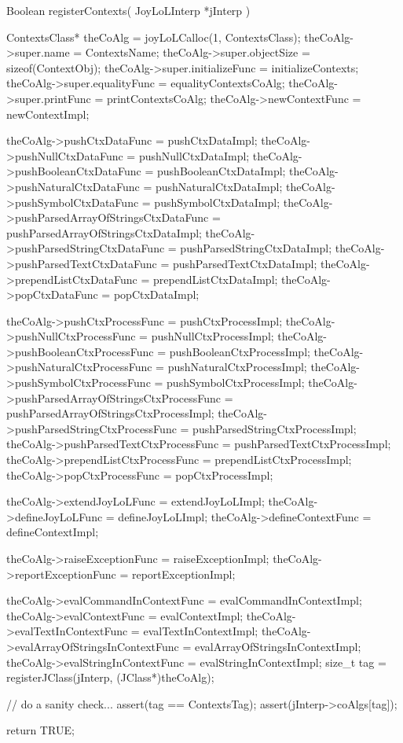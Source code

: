\startCCode
Boolean registerContexts(
  JoyLoLInterp *jInterp
) {
  ContextsClass* theCoAlg    = 
    joyLoLCalloc(1, ContextsClass);
  theCoAlg->super.name             = ContextsName;
  theCoAlg->super.objectSize       = sizeof(ContextObj);
  theCoAlg->super.initializeFunc   = initializeContexts;
  theCoAlg->super.equalityFunc     = equalityContextsCoAlg;
  theCoAlg->super.printFunc        = printContextsCoAlg;
  theCoAlg->newContextFunc         = newContextImpl;
  
  theCoAlg->pushCtxDataFunc        = pushCtxDataImpl;
  theCoAlg->pushNullCtxDataFunc    = pushNullCtxDataImpl;
  theCoAlg->pushBooleanCtxDataFunc = pushBooleanCtxDataImpl;
  theCoAlg->pushNaturalCtxDataFunc = pushNaturalCtxDataImpl;
  theCoAlg->pushSymbolCtxDataFunc  = pushSymbolCtxDataImpl;
  theCoAlg->pushParsedArrayOfStringsCtxDataFunc =
    pushParsedArrayOfStringsCtxDataImpl;
  theCoAlg->pushParsedStringCtxDataFunc =
    pushParsedStringCtxDataImpl;
  theCoAlg->pushParsedTextCtxDataFunc =
    pushParsedTextCtxDataImpl;
  theCoAlg->prependListCtxDataFunc = prependListCtxDataImpl;
  theCoAlg->popCtxDataFunc         = popCtxDataImpl;
  
  theCoAlg->pushCtxProcessFunc     = pushCtxProcessImpl;
  theCoAlg->pushNullCtxProcessFunc = pushNullCtxProcessImpl;
  theCoAlg->pushBooleanCtxProcessFunc =
    pushBooleanCtxProcessImpl;
  theCoAlg->pushNaturalCtxProcessFunc =
    pushNaturalCtxProcessImpl;
  theCoAlg->pushSymbolCtxProcessFunc =
    pushSymbolCtxProcessImpl;
  theCoAlg->pushParsedArrayOfStringsCtxProcessFunc =
    pushParsedArrayOfStringsCtxProcessImpl;
  theCoAlg->pushParsedStringCtxProcessFunc =
    pushParsedStringCtxProcessImpl;
  theCoAlg->pushParsedTextCtxProcessFunc =
    pushParsedTextCtxProcessImpl;
  theCoAlg->prependListCtxProcessFunc =
    prependListCtxProcessImpl;
  theCoAlg->popCtxProcessFunc      = popCtxProcessImpl;
  
  theCoAlg->extendJoyLoLFunc       = extendJoyLoLImpl;
  theCoAlg->defineJoyLoLFunc       = defineJoyLoLImpl;
  theCoAlg->defineContextFunc      = defineContextImpl;

  theCoAlg->raiseExceptionFunc     = raiseExceptionImpl;
  theCoAlg->reportExceptionFunc    = reportExceptionImpl;
  
  theCoAlg->evalCommandInContextFunc =
    evalCommandInContextImpl;
  theCoAlg->evalContextFunc        = evalContextImpl;
  theCoAlg->evalTextInContextFunc  = evalTextInContextImpl;
  theCoAlg->evalArrayOfStringsInContextFunc =
    evalArrayOfStringsInContextImpl;
  theCoAlg->evalStringInContextFunc =
    evalStringInContextImpl;
  size_t tag =
    registerJClass(jInterp, (JClass*)theCoAlg);

  // do a sanity check...
  assert(tag == ContextsTag);
  assert(jInterp->coAlgs[tag]);

  return TRUE;
}
\stopCCode

